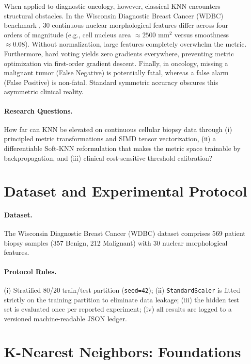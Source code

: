 \documentclass[10pt,twocolumn,letterpaper]{article}
\begin{document}
When applied to diagnostic oncology, however, classical KNN encounters structural obstacles. In the Wisconsin Diagnostic Breast Cancer (WDBC) benchmark \cite{wolberg1995}, 30 continuous nuclear morphological features differ across four orders of magnitude (e.g., cell nucleus area $\approx 2500\text{ mm}^2$ versus smoothness $\approx 0.08$). Without normalization, large features completely overwhelm the metric. Furthermore, hard voting yields zero gradients everywhere, preventing metric optimization via first-order gradient descent. Finally, in oncology, missing a malignant tumor (False Negative) is potentially fatal, whereas a false alarm (False Positive) is non-fatal. Standard symmetric accuracy obscures this asymmetric clinical reality.

\paragraph{Research Questions.} How far can KNN be elevated on continuous cellular biopsy data through (i) principled metric transformations and SIMD tensor vectorization, (ii) a differentiable Soft-KNN reformulation that makes the metric space trainable by backpropagation, and (iii) clinical cost-sensitive threshold calibration?

\section{Dataset and Experimental Protocol}
\paragraph{Dataset.} The Wisconsin Diagnostic Breast Cancer (WDBC) dataset comprises 569 patient biopsy samples (357 Benign, 212 Malignant) with 30 nuclear morphological features.
\paragraph{Protocol Rules.} (i) Stratified 80/20 train/test partition (\texttt{seed=42}); (ii) \texttt{StandardScaler} is fitted strictly on the training partition to eliminate data leakage; (iii) the hidden test set is evaluated once per reported experiment; (iv) all results are logged to a versioned machine-readable JSON ledger.

\section{K-Nearest Neighbors: Foundations}
\end{document}
